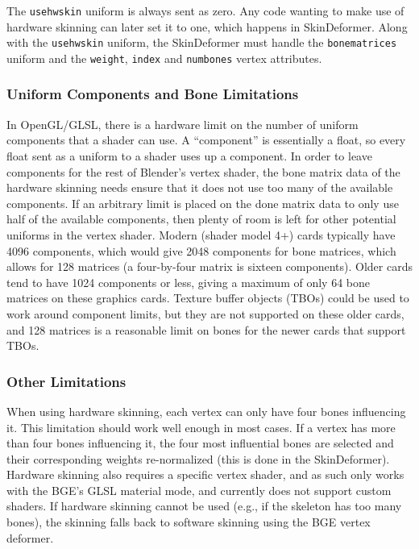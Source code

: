 The \texttt{usehwskin} uniform is always sent as zero.
Any code wanting to make use of hardware skinning can later set it to one, which happens in SkinDeformer.
Along with the \texttt{usehwskin} uniform, the SkinDeformer must handle the \texttt{bonematrices} uniform and the \texttt{weight}, \texttt{index} and \texttt{numbones} vertex attributes.

\subsubsection{Uniform Components and Bone Limitations}

In OpenGL/GLSL, there is a hardware limit on the number of uniform components that a shader can use.
A ``component'' is essentially a float, so every float sent as a uniform to a shader uses up a component.
In order to leave components for the rest of Blender's vertex shader, the bone matrix data of the hardware skinning needs ensure that it does not use too many of the available components.
If an arbitrary limit is placed on the done matrix data to only use half of the available components, then plenty of room is left for other potential uniforms in the vertex shader.
Modern (shader model 4+) cards typically have 4096 components, which would give 2048 components for bone matrices, which allows for 128 matrices (a four-by-four matrix is sixteen components).
Older cards tend to have 1024 components or less, giving a maximum of only 64 bone matrices on these graphics cards.
Texture buffer objects (TBOs) could be used to work around component limits\cite{ARB_texture_buffer_object}, but they are not supported on these older cards, and 128 matrices is a reasonable limit on bones for the newer cards that support TBOs.

\subsubsection{Other Limitations}

When using hardware skinning, each vertex can only have four bones influencing it.
This limitation should work well enough in most cases.
If a vertex has more than four bones influencing it, the four most influential bones are selected and their corresponding weights re-normalized (this is done in the SkinDeformer).
Hardware skinning also requires a specific vertex shader, and as such only works with the BGE's GLSL material mode, and currently does not support custom shaders.
If hardware skinning cannot be used (e.g., if the skeleton has too many bones), the skinning falls back to software skinning using the BGE vertex deformer.

